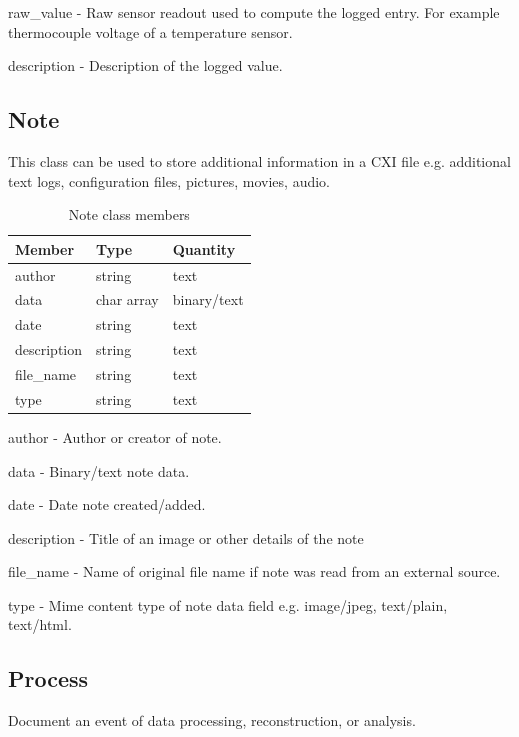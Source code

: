 \documentclass[usletter,11pt]{article}
\newcommand{\member}[2]
{ \noindent
{ \color{softBlue}  #1 - } #2
\vspace{0.2cm}
}
\begin{document}
\member{raw\_value}{Raw sensor readout used to compute the logged entry. For example
thermocouple voltage of a temperature sensor.}

\member{description}{Description of the logged value.}

\subsection{Note}
\label{table:note}

This class can be used to store additional information in a CXI file
e.g. additional text logs, configuration files, pictures, movies, audio.

\begin{table}[h!]\sffamily \footnotesize
\caption{Note class members}

\begin{tabular}{p{4.5cm} p{4.5cm}  p{2.5cm} }
\toprule
\bfseries Member     & \bfseries Type & \bfseries Quantity \\
\midrule

author & string & text \\
data & char array & binary/text \\
date & string & text \\
description & string & text \\
file\_name & string & text \\
type & string & text \\
\bottomrule
\end{tabular}
\end{table}

\member{author}{Author or creator of note.}

\member{data}{Binary/text note data.}

\member{date}{Date note created/added.}

\member{description}{Title of an image or other details of the note}

\member{file\_name}{Name of original file name if note was read from
 an external source.}

\member{type}{Mime content type of note data field e.g. image/jpeg,
 text/plain, text/html.}

\subsection{Process}
\label{table:process}

Document an event of data processing, reconstruction, or analysis.
\end{document}
